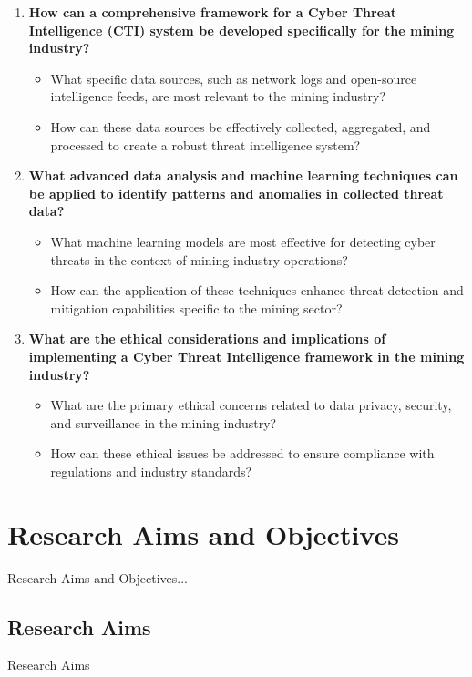 \documentclass[a4paper,twoside,12pt]{report}
\begin{document}
\begin{enumerate}
    \item \textbf{How can a comprehensive framework for a Cyber Threat Intelligence (CTI) system be developed specifically for the mining industry?}
    \begin{itemize}
        \item What specific data sources, such as network logs and open-source intelligence feeds, are most relevant to the mining industry?
        \item How can these data sources be effectively collected, aggregated, and processed to create a robust threat intelligence system?
    \end{itemize}
    
    \item \textbf{What advanced data analysis and machine learning techniques can be applied to identify patterns and anomalies in collected threat data?}
    \begin{itemize}
        \item What machine learning models are most effective for detecting cyber threats in the context of mining industry operations?
        \item How can the application of these techniques enhance threat detection and mitigation capabilities specific to the mining sector?
    \end{itemize}

    \item \textbf{What are the ethical considerations and implications of implementing a Cyber Threat Intelligence framework in the mining industry?}
    \begin{itemize}
        \item What are the primary ethical concerns related to data privacy, security, and surveillance in the mining industry?
        \item How can these ethical issues be addressed to ensure compliance with regulations and industry standards?
    \end{itemize}
\end{enumerate}
\section{Research Aims and Objectives}


Research Aims and Objectives...\\
\subsection{Research Aims}
Research Aims\\
\end{document}
